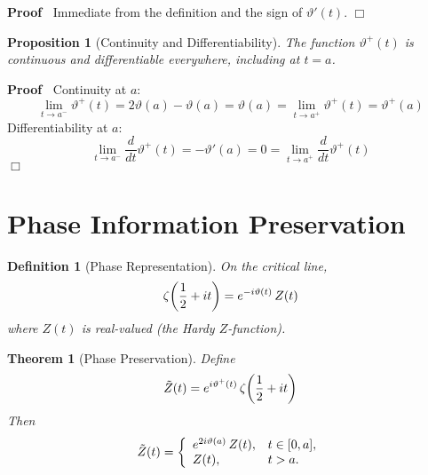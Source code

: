 \documentclass{article}
\newenvironment{proof}{\noindent\textbf{Proof\ }}{\hspace*{\fill}$\Box$\medskip}
\newtheorem{definition}{Definition}
\newtheorem{proposition}{Proposition}
\newtheorem{theorem}{Theorem}
\begin{document}
\begin{proof}
  Immediate from the definition and the sign of $\vartheta' (t)$.
\end{proof}

\begin{proposition}
  [Continuity and Differentiability]\label{prop:continuity} The function
  $\vartheta^+ (t)$ is continuous and differentiable everywhere, including at
  $t = a$.
\end{proposition}

\begin{proof}
  Continuity at $a$:
  \begin{equation}
    \lim_{t \to a^-} \vartheta^+ (t) = 2 \vartheta (a) - \vartheta (a) =
    \vartheta (a) = \lim_{t \to a^+} \vartheta^+ (t) = \vartheta^+ (a)
  \end{equation}
  Differentiability at $a$:
  \[ \lim_{t \to a^-}  \frac{d}{dt} \vartheta^+ (t) = - \vartheta' (a) = 0 =
     \lim_{t \to a^+}  \frac{d}{dt} \vartheta^+ (t) \]
\end{proof}

\section{Phase Information Preservation}

\begin{definition}
  [Phase Representation]\label{def:phase} On the critical line,
  \begin{equation}
    \zeta \hspace{-0.17em} \left( \frac{1}{2} + it \right) = e^{- i \vartheta
    (t)}  \hspace{0.17em} Z (t)
  \end{equation}
  where $Z (t)$ is real-valued (the Hardy $Z$-function).
\end{definition}

\begin{theorem}
  [Phase Preservation]\label{thm:phase_preservation} Define
  \begin{equation}
    \tilde{Z} (t) = e^{i \vartheta^+ (t)}  \hspace{0.17em} \zeta
    \hspace{-0.17em} \left( \frac{1}{2} + it \right)
  \end{equation}
  Then
  \begin{equation}
    \tilde{Z} (t) = \left\{\begin{array}{ll}
      e^{2 i \vartheta (a)}  \hspace{0.17em} Z (t), & t \in [0, a],\\
      Z (t), & t > a.
    \end{array}\right.
  \end{equation}
\end{theorem}
\end{document}
